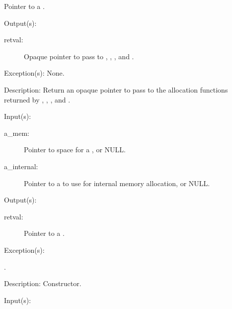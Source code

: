 \begin{capi}
\begin{capilist}
\begin{description}
			Pointer to a .
		\end{description}
	\item[Output(s): ]
		\begin{description}\item[]
		\item[retval: ]
			Opaque pointer to pass to ,
			, , and
			.
		\end{description}
	\item[Exception(s): ] None.
	\item[Description: ]
		Return an opaque pointer to pass to the allocation functions
		returned by ,
		,
		, and
		.
	\end{capilist}
\label{mem_new}
	\begin{capilist}
	\item[Input(s): ]
		\begin{description}\item[]
		\item[a\_mem: ]
			Pointer to space for a , or NULL.
		\item[a\_internal: ]
			Pointer to a  to use for internal
			memory allocation, or NULL.
		\end{description}
	\item[Output(s): ]
		\begin{description}\item[]
		\item[retval: ]
			Pointer to a .
		\end{description}
	\item[Exception(s): ]
		\begin{description}\item[]
		\item[.]
		\end{description}
	\item[Description: ]
		Constructor.
	\end{capilist}
\label{mem_delete}
	\begin{capilist}
	\item[Input(s): ]

\end{capilist}
\end{capi}
